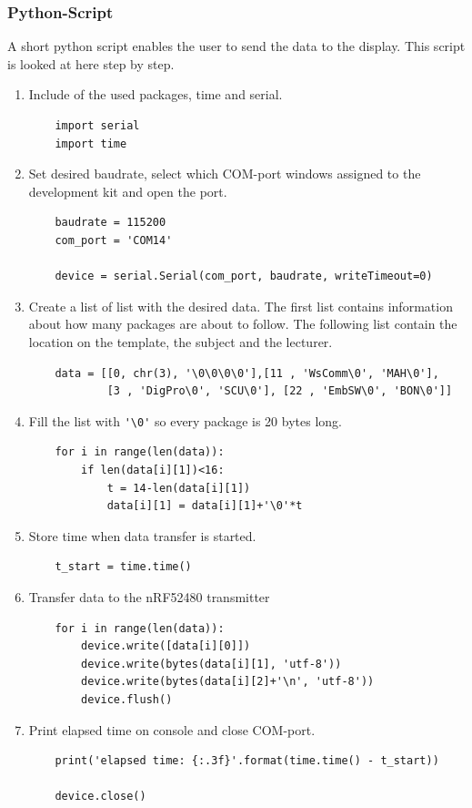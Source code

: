 \subsubsection{Python-Script}
\lstset{basicstyle=\footnotesize}
\lstset{style=mystyle}

A short python script enables the user to send the data to the display.
This script is looked at here step by step.

\begin{enumerate}
	\item Include of the used packages, time and serial.
	\begin{lstlisting}
	import serial
	import time
	\end{lstlisting}	
	\item Set desired baudrate, select which COM-port windows assigned to the development kit and open the port.
	\begin{lstlisting}
	baudrate = 115200
	com_port = 'COM14'
	
	device = serial.Serial(com_port, baudrate, writeTimeout=0)
	\end{lstlisting}
	\item Create a list of list with the desired data.
	The first list contains information about how many packages are about to follow.
	The following list contain the location on the template, the subject and the lecturer.
	\begin{lstlisting}
	data = [[0, chr(3), '\0\0\0\0'],[11 , 'WsComm\0', 'MAH\0'],
			[3 , 'DigPro\0', 'SCU\0'], [22 , 'EmbSW\0', 'BON\0']]
	\end{lstlisting}
	\item Fill the list with \lstinline|'\0'| so every package is 20 bytes long.
	\begin{lstlisting}
	for i in range(len(data)):
		if len(data[i][1])<16:
			t = 14-len(data[i][1])
			data[i][1] = data[i][1]+'\0'*t
	\end{lstlisting}
	\item Store time when data transfer is started.
	\begin{lstlisting}
	t_start = time.time()
	\end{lstlisting}
	\item Transfer data to the nRF52480 transmitter
	\begin{lstlisting}
	for i in range(len(data)):
		device.write([data[i][0]]) 
		device.write(bytes(data[i][1], 'utf-8'))       
		device.write(bytes(data[i][2]+'\n', 'utf-8'))
		device.flush()
	\end{lstlisting}	
	\item Print elapsed time on console and close COM-port.
	\begin{lstlisting}
	print('elapsed time: {:.3f}'.format(time.time() - t_start))
	
	device.close()
	\end{lstlisting}
	
\end{enumerate}
